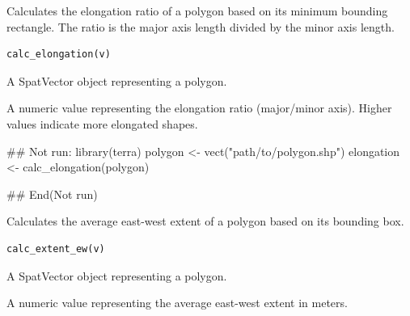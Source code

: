 \documentclass[letterpaper]{book}
\begin{document}
%
\begin{Description}
Calculates the elongation ratio of a polygon based on its minimum bounding
rectangle. The ratio is the major axis length divided by the minor axis length.
\end{Description}
%
\begin{Usage}
\begin{verbatim}
calc_elongation(v)
\end{verbatim}
\end{Usage}
%
\begin{Arguments}
\begin{ldescription}
\item[\code{v}] A SpatVector object representing a polygon.
\end{ldescription}
\end{Arguments}
%
\begin{Value}
A numeric value representing the elongation ratio (major/minor axis).
Higher values indicate more elongated shapes.
\end{Value}
%
\begin{Examples}
\begin{ExampleCode}
## Not run: 
library(terra)
polygon <- vect("path/to/polygon.shp")
elongation <- calc_elongation(polygon)

## End(Not run)
\end{ExampleCode}
\end{Examples}
%
\begin{Description}
Calculates the average east-west extent of a polygon based on its bounding box.
\end{Description}
%
\begin{Usage}
\begin{verbatim}
calc_extent_ew(v)
\end{verbatim}
\end{Usage}
%
\begin{Arguments}
\begin{ldescription}
\item[\code{v}] A SpatVector object representing a polygon.
\end{ldescription}
\end{Arguments}
%
\begin{Value}
A numeric value representing the average east-west extent in meters.
\end{Value}
\end{document}
